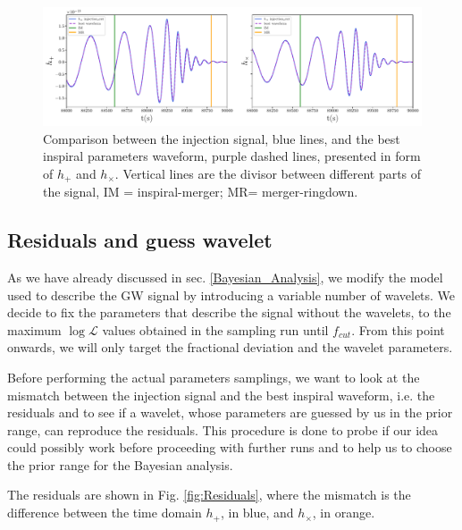 \begin{figure}[h!]
    \centering
    \includegraphics[width=1\textwidth]{Images/Inj_best_insp.pdf}
    \caption{Comparison between the injection signal, blue lines, and the best inspiral parameters waveform, purple dashed lines, presented in form of $h_{+}$ and $h_{\times}$. Vertical lines are the divisor between different parts of the signal, IM = inspiral-merger; MR= merger-ringdown. }
    \label{fig:Inj_best_insp}
\end{figure}



\subsection{Residuals and guess wavelet}

As we have already discussed in sec. \ref{Bayesian_Analysis}, we modify the model used to describe the GW signal by introducing a variable number of wavelets. We decide to fix the parameters that describe the signal without the wavelets, to the maximum $\log \mathcal{L}$ values obtained in the sampling run until $f_{cut}$. From this point onwards, we will only target the fractional deviation and the wavelet parameters.

Before performing the actual parameters samplings, we want to look at the mismatch between the injection signal and the best inspiral waveform, i.e. the residuals and to see if a wavelet, whose parameters are guessed by us in the prior range, can reproduce the residuals. This procedure is done to probe if our idea could possibly work before proceeding with further runs and to help us to choose the prior range for the Bayesian analysis. 

The residuals are shown in Fig. \ref{fig:Residuals}, where the mismatch is the difference between the time domain $h_{+}$, in blue, and $h_{\times}$, in orange. 

